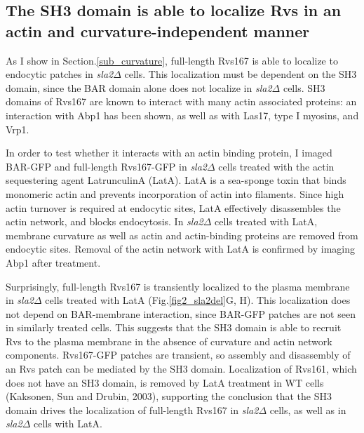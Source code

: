 	\vspace{5mm}


	\subsection{The SH3 domain is able to localize Rvs in an actin and curvature-independent manner}
	\label{delsh3_latA}
As I show in Section.\ref{sub_curvature}, full-length Rvs167 is able to localize to endocytic patches in \textit{sla2$\Delta$} cells. This localization must be dependent on the SH3 domain, since the BAR domain alone does not localize in \textit{sla2$\Delta$} cells. SH3 domains of Rvs167 are known to interact with many actin associated proteins: an interaction with Abp1 has been shown, as well as with Las17, type I myosins, and Vrp1. 

	\vspace{5mm}
	
In order to test whether it interacts with an actin binding protein, I imaged BAR-GFP and full-length Rvs167-GFP in \textit{sla2$\Delta$} cells treated with the actin sequestering agent LatrunculinA (LatA). LatA is a sea-sponge toxin that binds monomeric actin and prevents incorporation of actin into filaments. Since high actin turnover is required at endocytic sites, LatA effectively disassembles the actin network, and blocks endocytosis. In \textit{sla2$\Delta$} cells treated with LatA, membrane curvature as well as actin and actin-binding proteins are removed from endocytic sites. Removal of the actin network with LatA is confirmed by imaging Abp1 after treatment.

	\vspace{5mm}
Surprisingly, full-length Rvs167 is transiently localized to the plasma membrane in \textit{sla2$\Delta$} cells treated with LatA (Fig.\ref{fig2_sla2del}G, H). This localization does not depend on BAR-membrane interaction, since BAR-GFP patches are not seen in similarly treated cells. This suggests that the SH3 domain is able to recruit Rvs to the plasma membrane in the absence of curvature and actin network components. Rvs167-GFP patches are transient, so assembly and disassembly of an Rvs patch can be mediated by the SH3 domain. Localization of Rvs161, which does not have an SH3 domain, is removed by LatA treatment in WT cells (Kaksonen, Sun and Drubin, 2003), supporting the conclusion that the SH3 domain drives the localization of full-length Rvs167 in \textit{sla2$\Delta$}  cells, as well as in \textit{sla2$\Delta$} cells with LatA. 


